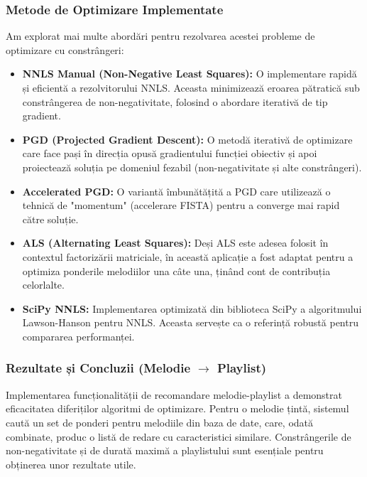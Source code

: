\documentclass[12pt,a4paper]{article}
\begin{document}
	\subsubsection{Metode de Optimizare Implementate}
	Am explorat mai multe abordări pentru rezolvarea acestei probleme de optimizare cu constrângeri:

	\begin{itemize}
		\item \textbf{NNLS Manual (Non-Negative Least Squares):} O implementare rapidă și eficientă a rezolvitorului NNLS. Aceasta minimizează eroarea pătratică sub constrângerea de non-negativitate, folosind o abordare iterativă de tip gradient.
		\item \textbf{PGD (Projected Gradient Descent):} O metodă iterativă de optimizare care face pași în direcția opusă gradientului funcției obiectiv și apoi proiectează soluția pe domeniul fezabil (non-negativitate și alte constrângeri).
		\item \textbf{Accelerated PGD:} O variantă îmbunătățită a PGD care utilizează o tehnică de "momentum" (accelerare FISTA) pentru a converge mai rapid către soluție.
		\item \textbf{ALS (Alternating Least Squares):} Deși ALS este adesea folosit în contextul factorizării matriciale, în această aplicație a fost adaptat pentru a optimiza ponderile melodiilor una câte una, ținând cont de contribuția celorlalte.
		\item \textbf{SciPy NNLS:} Implementarea optimizată din biblioteca SciPy a algoritmului Lawson-Hanson pentru NNLS. Aceasta servește ca o referință robustă pentru compararea performanței.
	\end{itemize}

	\subsubsection{Rezultate și Concluzii (Melodie $\rightarrow$ Playlist)}
	Implementarea funcționalității de recomandare melodie-playlist a demonstrat eficacitatea diferiților algoritmi de optimizare. Pentru o melodie țintă, sistemul caută un set de ponderi pentru melodiile din baza de date, care, odată combinate, produc o listă de redare cu caracteristici similare. Constrângerile de non-negativitate și de durată maximă a playlistului sunt esențiale pentru obținerea unor rezultate utile.
\end{document}
